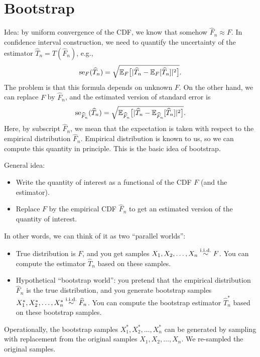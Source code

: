 \documentclass[11pt,letterpaper]{article}
\numberwithin{assumption}{lecture}
\numberwithin{theorem}{lecture}
\numberwithin{proposition}{lecture}
\numberwithin{lemma}{lecture}
\numberwithin{claim}{lecture}
\numberwithin{corollary}{lecture}
\numberwithin{definition}{lecture}
\numberwithin{conjecture}{lecture}
\numberwithin{remark}{lecture}
\numberwithin{example}{lecture}
\numberwithin{equation}{lecture}
\begin{document}
\section{Bootstrap}
Idea: by uniform convergence of the CDF, we know that somehow $\widehat{F}_n \approx F$. In confidence interval construction, we need to quantify the uncertainty of the estimator $\widehat{T}_n = T(\widehat{F}_n)$, e.g.,
\begin{align*}
  \mathrm{se}_F (\widehat{T}_n) = \sqrt{{\mathbb{E}}_F \big[ | \widehat{T}_n - {\mathbb{E}}_F [\widehat{T}_n] |^2 \big]}.
\end{align*}
The problem is that this formula depends on unknown $F$. On the other hand, we can replace $F$ by $\widehat{F}_n$, and the estimated version of standard error is
\begin{align*}
   \mathrm{se}_{\widehat{F}_n} (\widehat{T}_n) = \sqrt{{\mathbb{E}}_{\widehat{F}_n} \big[ | \widehat{T}_n - {\mathbb{E}}_{\widehat{F}_n} [\widehat{T}_n] |^2 \big]}.
\end{align*}
Here, by subscript $\widehat{F}_n$, we mean that the expectation is taken with respect to the empirical distribution $\widehat{F}_n$. Empirical distribution is known to us, so we can compute this quantity in principle. This is the basic idea of bootstrap.

General idea:
\begin{itemize}
  \item Write the quantity of interest as a functional of the CDF $F$ (and the estimator).
  \item Replace $F$ by the empirical CDF $\widehat{F}_n$ to get an estimated version of the quantity of interest.
\end{itemize}

In other words, we can think of it as two ``parallel worlds'':
\begin{itemize}
  \item True distribution is $F$, and you get samples $X_1, X_2, \ldots, X_n \overset{\mathrm{i.i.d.}}{\sim} F$. You can compute the estimator $\widehat{T}_n$ based on these samples.
  \item Hypothetical ``bootstrap world'': you pretend that the empirical distribution $\widehat{F}_n$ is the true distribution, and you generate bootstrap samples $X_1^*, X_2^*, \ldots, X_n^* \overset{\mathrm{i.i.d.}}{\sim} \widehat{F}_n$. You can compute the bootstrap estimator $\widehat{T}_n^*$ based on these bootstrap samples.
\end{itemize}
Operationally, the bootstrap samples $X_1^*, X_2^*, \ldots, X_n^*$ can be generated by sampling with replacement from the original samples $X_1, X_2, \ldots, X_n$. We re-sampled the original samples.
\end{document}
